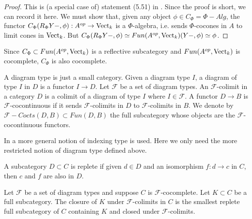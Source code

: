 \begin{proof}
  This is (a special case of) statement (5.51) in
  \cite{kelly/basic-concepts-enriched}. Since the proof is short, we can
  record it here. We must show that, given any object $\phi\in
  C_{\Phi}=\Phi-Alg$, the functor $C_{\Phi}(R_{\Phi}Y-,\phi):A^{op}\to\operatorname{Vect}_k$
  is a $\Phi$-algebra, i.e. sends $\Phi$-cocones in $A$ to limit cones in
  $\operatorname{Vect}_k$. But $C_{\Phi}(R_{\Phi}Y-,\phi)\simeq
  Fun(A^{op},\operatorname{Vect}_k)(Y-,\phi)\simeq\phi$.
\end{proof}


\begin{remark}

  \noindent Since $C_{\Phi}\subset Fun(A^{op},\operatorname{Vect}_k)$ is a reflective
  subcategory and $Fun(A^{op},\operatorname{Vect}_k)$ is cocomplete, $C_{\Phi}$ is also
  cocomplete.
\end{remark}

\begin{definition}
  \noindent A diagram type is just a small category. Given a diagram type $I$,
  a diagram of type $I$ in $D$ is a functor $I\to D$. Let $\mathcal{F}$ be a
  set of diagram types. An $\mathcal{F}$-colimit in a category $D$ is a
  colimit of a diagram of type $I$ where $I\in \mathcal{F}$. A functor $D\to
  B$ is $\mathcal{F}$-cocontinuous if it sends $\mathcal{F}$-colimits in $D$
  to $\mathcal{F}$-colimits in $B$. We denote by
  $\mathcal{F}-Cocts(D,B)\subset Fun(D,B)$ the full subcategory whose objects
  are the $\mathcal{F}$-cocontinuous functors.
\end{definition}

\begin{remark}
  In \cite{kelly/basic-concepts-enriched} a more general notion of indexing
  type is used. Here we only need the more restricted notion of diagram type
  defined above.
\end{remark}

\begin{definition}

  \noindent A subcategory $D\subset C$ is replete if given $d\in D$ and an
  isomorphism $f:d\to c$ in $C$, then $c$ and $f$ are also in $D$.
\end{definition}


\begin{definition}

  \noindent Let $\mathcal{F}$ be a set of diagram types and suppose $C$ is
  $\mathcal{F}$-cocomplete. Let $K\subset C$ be a full subcategory. The
  closure of $K$ under $\mathcal{F}$-colimits in $C$ is the smallest replete
  full subcategory of $C$ containing $K$ and closed under
  $\mathcal{F}$-colimits.
\end{definition}

